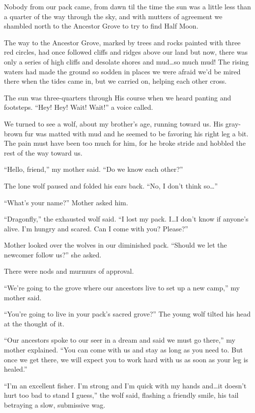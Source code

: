\secdiv

\noindent Nobody from our pack came, from dawn til the time the sun was a little less than a quarter of the way through the sky, and with mutters of agreement we shambled north to the Ancestor Grove to try to find Half Moon.

The way to the Ancestor Grove, marked by trees and rocks painted with three red circles, had once followed cliffs and ridges above our land but now, there was only a series of high cliffs and desolate shores and mud\ldots{}so much mud! The rising waters had made the ground so sodden in places we were afraid we'd be mired there when the tides came in, but we carried on, helping each other cross.

The sun was three-quarters through His course when we heard panting and footsteps. ``Hey! Hey! Wait! Wait!'' a voice called.

We turned to see a wolf, about my brother's age, running toward us. His gray-brown fur was matted with mud and he seemed to be favoring his right leg a bit. The pain must have been too much for him, for he broke stride and hobbled the rest of the way toward us.

``Hello, friend,'' my mother said. ``Do we know each other?''

The lone wolf paused and folded his ears back. ``No, I don't think so\ldots''

``What's your name?'' Mother asked him.

``Dragonfly,'' the exhausted wolf said. ``I lost my pack. I\ldots{}I don't know if anyone's alive. I'm hungry and scared. Can I come with you? Please?''

Mother looked over the wolves in our diminished pack. ``Should we let the newcomer follow us?'' she asked.

There were nods and murmurs of approval.

``We're going to the grove where our ancestors live to set up a new camp,'' my mother said.

``You're going to live in your pack's sacred grove?'' The young wolf tilted his head at the thought of it.

``Our ancestors spoke to our seer in a dream and said we must go there,'' my mother explained. ``You can come with us and stay as long as you need to. But once we get there, we will expect you to work hard with us as soon as your leg is healed.''

``I'm an excellent fisher. I'm strong and I'm quick with my hands and\ldots{}it doesn't hurt too bad to stand I guess,'' the wolf said, flashing a friendly smile, his tail betraying a slow, submissive wag.

